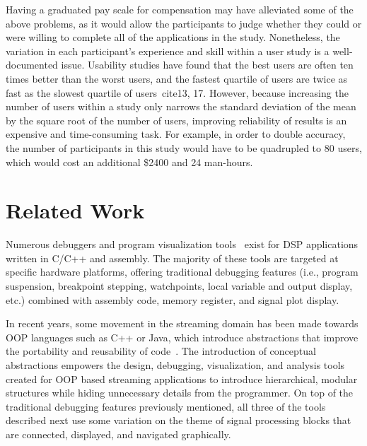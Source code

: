 \documentclass[11pt, letterpaper, onecolumn]{article}
\begin{document}
Having a graduated pay scale for compensation may have alleviated some
of the  above problems,  as it would  allow the participants  to judge
whether they could or were willing to complete all of the applications
in  the  study.   Nonetheless,  the variation  in  each  participant's
experience  and  skill  within  a  user  study  is  a  well-documented
issue. Usability studies have found  that the best users are often ten
times better than  the worst users, and the  fastest quartile of users
are  twice   as  fast  as  the  slowest   quartile  of  users~cite{13,
17}. However,  because increasing the  number of users within  a study
only narrows the standard deviation of  the mean by the square root of
the number  of users\cite{13}, improving reliability of  results is an
expensive  and time-consuming task.  For example,  in order  to double
accuracy, the  number of participants in  this study would  have to be
quadrupled to 80  users, which would cost an  additional \$2400 and 24
man-hours.


\section{Related Work}

Numerous        debuggers       and        program       visualization
tools~\cite{42,35,7,39,19,6,9,36}  exist for DSP  applications written
in C/C++  and assembly.  The majority  of these tools  are targeted at
specific hardware  platforms, offering traditional  debugging features
(i.e.,  program suspension,  breakpoint  stepping, watchpoints,  local
variable  and  output display,  etc.)   combined  with assembly  code,
memory register, and signal plot display.

In recent years,  some movement in the streaming  domain has been made
towards  OOP   languages  such  as   C++  or  Java,   which  introduce
abstractions   that  improve  the   portability  and   reusability  of
code~\cite{30}. The  introduction of conceptual  abstractions empowers
the design,  debugging, visualization, and analysis  tools created for
OOP  based streaming applications  to introduce  hierarchical, modular
structures while  hiding unnecessary  details from the  programmer. On
top of  the traditional  debugging features previously  mentioned, all
three of the  tools described next use some variation  on the theme of
signal processing blocks that  are connected, displayed, and navigated
graphically.
\end{document}
